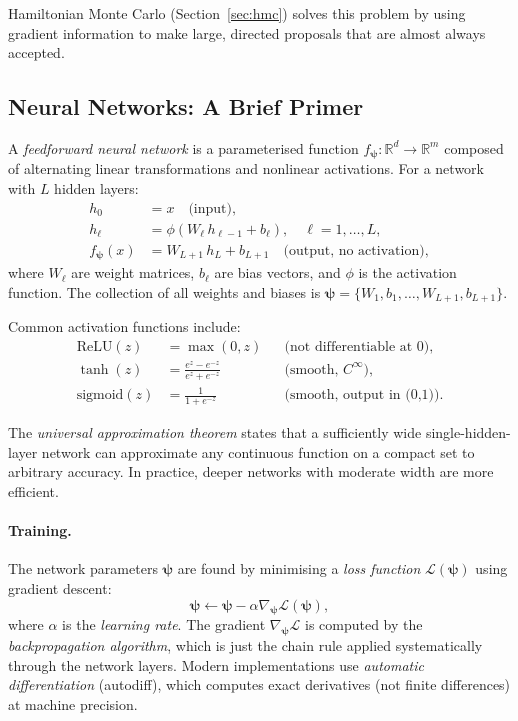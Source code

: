 \documentclass[11pt,a4paper]{article}
\theoremstyle{definition}
\newcommand{\R}{\mathbb{R}}
\newcommand{\bpsi}{\boldsymbol{\psi}}
\begin{document}
	Hamiltonian Monte Carlo (Section~\ref{sec:hmc}) solves this problem by using gradient information to make large, directed proposals that are almost always accepted.
	
	\subsection{Neural Networks: A Brief Primer}
	\label{sec:nn_primer}
	
	A \emph{feedforward neural network} is a parameterised function $f_{\bpsi}: \R^d \to \R^m$ composed of alternating linear transformations and nonlinear activations.
	For a network with $L$ hidden layers:
	\begin{align}
		h_0 &= x \quad \text{(input)}, \\
		h_\ell &= \phi(W_\ell \, h_{\ell-1} + b_\ell), \quad \ell = 1, \ldots, L, \\
		f_{\bpsi}(x) &= W_{L+1} \, h_L + b_{L+1} \quad \text{(output, no activation)},
	\end{align}
	where $W_\ell$ are weight matrices, $b_\ell$ are bias vectors, and $\phi$ is the activation function.
	The collection of all weights and biases is $\bpsi = \{W_1, b_1, \ldots, W_{L+1}, b_{L+1}\}$.
	
	Common activation functions include:
	\begin{align}
		\text{ReLU}(z) &= \max(0, z) & & \text{(not differentiable at 0)}, \\
		\tanh(z) &= \frac{e^z - e^{-z}}{e^z + e^{-z}} & & \text{(smooth, } C^\infty\text{)}, \\
		\text{sigmoid}(z) &= \frac{1}{1 + e^{-z}} & & \text{(smooth, output in (0,1))}.
	\end{align}
	
	The \emph{universal approximation theorem} states that a sufficiently wide single-hidden-layer network can approximate any continuous function on a compact set to arbitrary accuracy.
	In practice, deeper networks with moderate width are more efficient.
	
	\paragraph{Training.}
	The network parameters $\bpsi$ are found by minimising a \emph{loss function} $\mathcal{L}(\bpsi)$ using gradient descent:
	\begin{equation}
		\bpsi \leftarrow \bpsi - \alpha \nabla_{\bpsi} \mathcal{L}(\bpsi),
	\end{equation}
	where $\alpha$ is the \emph{learning rate}.
	The gradient $\nabla_{\bpsi}\mathcal{L}$ is computed by the \emph{backpropagation algorithm}, which is just the chain rule applied systematically through the network layers.
	Modern implementations use \emph{automatic differentiation} (autodiff), which computes exact derivatives (not finite differences) at machine precision.
	
\end{document}
